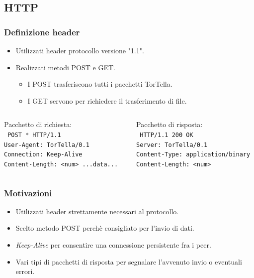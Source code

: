 \documentclass[a4paper,italian,12pt]{beamer}
\begin{document}
		\subsection{HTTP}
			\begin{frame}
				\frametitle{Definizione header}
				\begin{itemize}
					\item Utilizzati header protocollo versione "1.1".
					\item Realizzati metodi POST e GET.
					\begin{itemize}
						\item I POST trasferiscono tutti i pacchetti TorTella.
						\item I GET servono per richiedere il trasferimento di file.
					\end{itemize}
				\end{itemize}
				\vspace{2mm}
				\begin{columns}
					\footnotesize{
					\begin{column}{0.5\textwidth}			
						Pacchetto di richiesta:\\
						\texttt{					
							POST * HTTP/1.1\\
							User-Agent: TorTella/0.1\\
							Connection: Keep-Alive\\
							Content-Length: <num>
							...data...
						}
					\end{column}
					\begin{column}{0.5\textwidth}
						Pacchetto di risposta:\\
						\vspace{2mm}
						\texttt{					
							HTTP/1.1 200 OK\\
							Server: TorTella/0.1\\
							Content-Type: application/binary\\
							Content-Length: <num>
						}
					\end{column}
					}
				\end{columns}
			\end{frame}
			
			\begin{frame}
				\frametitle{Motivazioni}
				\begin{itemize}
					\item Utilizzati header strettamente necessari al protocollo.
					\item Scelto metodo POST perchè consigliato per l'invio di dati.
					\item \textit{Keep-Alive} per consentire una connessione persistente fra i peer.
					\item Vari tipi di pacchetti di risposta per segnalare l'avvenuto invio o eventuali errori.
				\end{itemize}
			\end{frame}
\end{document}
